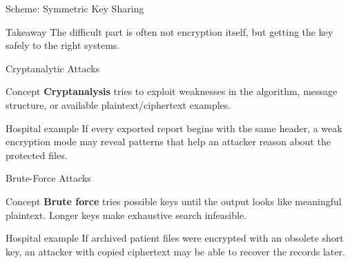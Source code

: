 \documentclass[presentation]{beamer}
\begin{document}
\begin{frame}[c]{Scheme: Symmetric Key Sharing}
\begin{center}
\end{center}

\begin{block}{Takeaway}
The difficult part is often not encryption itself, but getting the key safely to the right systems.
\end{block}
\end{frame}

\begin{frame}[c]{Cryptanalytic Attacks}
\begin{block}{Concept}
\textbf{Cryptanalysis} tries to exploit weaknesses in the algorithm, message structure, or available
plaintext/ciphertext examples.
\end{block}

\begin{exampleblock}{Hospital example}
If every exported report begins with the same header, a weak encryption mode may reveal patterns
that help an attacker reason about the protected files.
\end{exampleblock}
\end{frame}

\begin{frame}[c]{Brute-Force Attacks}
\begin{block}{Concept}
\textbf{Brute force} tries possible keys until the output looks like meaningful plaintext. Longer keys
make exhaustive search infeasible.
\end{block}

\begin{exampleblock}{Hospital example}
If archived patient files were encrypted with an obsolete short key, an attacker with copied
ciphertext may be able to recover the records later.
\end{exampleblock}
\end{frame}
\end{document}
